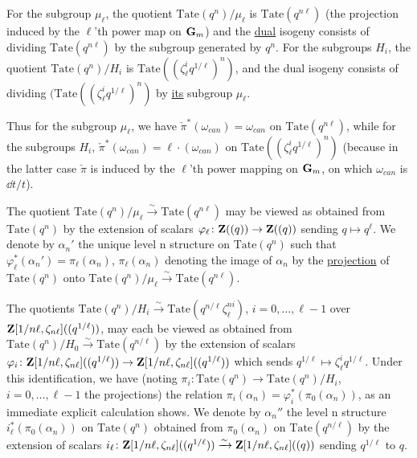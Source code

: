 For the subgroup $\mu_\ell$, the quotient $\mathrm{Tate}(q^n)/\mu_\ell$ is
$\mathrm{Tate}(q^{n\ell})$ (the projection induced by the $\ell$'th power map on
$\mathbf{G}_m$) and the \uline{dual} isogeny consists of dividing $\mathrm{Tate}(q^{n\ell})$
by the subgroup generated by $q^n$. For the subgroups $H_i$, the quotient
$\mathrm{Tate}(q^n)/H_i$ is $\mathrm{Tate}((\zeta_\ell^i q^{1/\ell})^n)$, and the
dual isogeny consists of dividing $(\mathrm{Tate}((\zeta_\ell^i q^{1/\ell})^n)$
by \uline{its} subgroup $\mu_\ell$.

Thus for the subgroup $\mu_\ell$, we have
$\check\pi^*(\omega_{can}) = \omega_{can}$ on $\mathrm{Tate}(q^{n\ell})$, while
for the subgroups $H_i$, $\check\pi^*(\omega_{can}) = \ell\cdot(\omega_{can})$
on $\mathrm{Tate}((\zeta_\ell^i q^{1/\ell})^n)$ (because in the latter case
$\check\pi$ is induced by the $\ell$'th power mapping on $\mathbf{G}_m$, on which
$\omega_{can}$ is $\dd t/t$).

The quotient $\mathrm{Tate}(q^n)/\mu_\ell\xrightarrow{\sim}\mathrm{Tate}(q^{n\ell})$
may be viewed as obtained from $\mathrm{Tate}(q^n)$ by the extension of scalars
$\varphi_\ell\colon\mathbf{Z}((q))\to\mathbf{Z}((q))$ sending $q\mapsto q^\ell$. We denote by
$\alpha_n'$ the unique level n structure on $\mathrm{Tate}(q^n)$ such that
$\varphi_\ell^*(\alpha_n') = \pi_\ell(\alpha_n)$, $\pi_\ell(\alpha_n)$ denoting
the image of $\alpha_n$ by the \uline{projection} of $\mathrm{Tate}(q^n)$ onto
$\mathrm{Tate}(q^n)/\mu_\ell\xrightarrow{\sim}\mathrm{Tate}(q^{n\ell})$.

The quotients $\mathrm{Tate}(q^n)/H_i\xrightarrow{\sim}\mathrm{Tate}(q^{n/\ell}\zeta_\ell^{ni})$,
$i=0,\ldots,\ell-1$ over $\mathbf{Z}[1/n\ell,\zeta_{n\ell}]((q^{1/\ell}))$, may each be
viewed as obtained from $\mathrm{Tate}(q^n)/H_0\xrightarrow{\sim}\mathrm{Tate}(q^{n/\ell})$
by the extension of scalars
$\varphi_i\colon\mathbf{Z}[1/n\ell,\zeta_{n\ell}]((q^{1/\ell}))\allowbreak\to\mathbf{Z}[1/n\ell,\zeta_{n\ell}]((q^{1/\ell}))$
which sends $q^{1/\ell}\mapsto\zeta_\ell^i q^{1/\ell}$. Under this
identification, we have (noting $\pi_i\colon\mathrm{Tate}(q^n)\to\mathrm{Tate}(q^n)/H_i$,
$i=0,\ldots,\ell-1$ the projections) the relation
$\pi_i(\alpha_n) = \varphi_i^*(\pi_0(\alpha_n))$, as an immediate explicit
calculation shows. We denote by $\alpha_n''$ the level n structure
$i_\ell^*(\pi_0(\alpha_n))$ on $\mathrm{Tate}(q^n)$ obtained from
$\pi_0(\alpha_n)$ on $\mathrm{Tate}(q^{n/\ell})$ by the extension of scalars
$i_\ell\colon\mathbf{Z}[1/n\ell,\zeta_{n\ell}]((q^{1/\ell}))\xrightarrow{\sim}\mathbf{Z}[1/n\ell,\zeta_{n\ell}]((q))$
sending $q^{1/\ell}$ to $q$.

